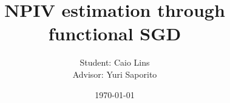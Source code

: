 \usepackage{global-macros}
\usepackage{graphicx}
\graphicspath{{../fig}}
\usepackage{algpseudocode, algorithm}
\usepackage{biblatex}

\vfuzz=30pt




\title{NPIV estimation through functional SGD}
\author{Student: Caio Lins
        \\ Advisor: Yuri Saporito
}
\date{\today}




\newcommand{\boldf}{\boldsymbol{f}}

\newcommand{\hstar}{h^{ \star }}
\newcommand{\risk}{\mathcal{R}}
\newcommand{\loss}{\ell}
\renewcommand{\hat}{\widehat}
\newcommand{\iid}{\overset{\mathrm{iid}}{\sim}}
\DeclareMathOperator{\diam}{diam}
\newcommand{\data}{\mathcal{D}}
\newcommand{\dataproj}{\mathcal{D}_{ \mathrm{proj} }}
